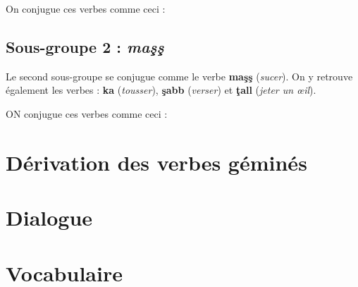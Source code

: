 On conjugue ces verbes comme ceci : 

\subsection{Sous-groupe 2 : \textit{ma\c{s}\c{s}}}
Le second sous-groupe se conjugue comme le verbe \textbf{ma\c{s}\c{s}} (\textit{sucer}). On y retrouve également les verbes : \textbf{ka\textcrh\textcrh} (\textit{tousser}), \textbf{\c{s}abb} (\textit{verser}) et \textbf{\c{t}all} (\textit{jeter un \oe il}).

ON conjugue ces verbes comme ceci :

\section{Dérivation des verbes géminés}


\section*{Dialogue}
\section*{Vocabulaire}